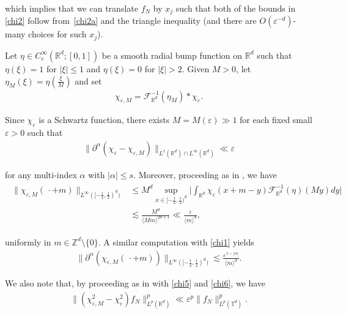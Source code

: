 \documentclass[letterpaper, 11pt,  reqno]{amsart}
\newcommand{\noi}{\noindent}
\newcommand{\Z}{\mathbb{Z}}
\newcommand{\R}{\mathbb{R}}
\newcommand{\T}{\mathbb{T}}
\newcommand{\al}{\alpha}
\newcommand{\eps}{\varepsilon}
\newcommand{\dd}{\partial}
\newcommand{\les}{\lesssim}
\newcommand{\jb}[1]
{\langle #1 \rangle}
\numberwithin{equation}{section}
\numberwithin{theorem}{section}
\begin{document}
\noi
which implies that we can  translate $f_N$ by $x_j$
such that 
both of the bounds in \eqref{chi2} 
follow from~\eqref{chi2a} and the triangle inequality
(and there are $O(\eps^{-d})$-many choices for such $x_j$).










Let $\eta \in C_c^{\infty}(\R^d;[0,1])$ be a smooth radial bump function on $\R^d$ such that 
$\eta(\xi)=1$ for $|\xi|\le 1$
and $\eta(\xi)=0$ for $|\xi|>2$.
 Given $M>0$, let $\eta_M(\xi)=\eta(\frac{\xi}{M})$
 and set 
\begin{align}
\chi_{\eps,M}=\mathcal{F}^{-1}_{\R^d}(\eta_M)*\chi_{\eps}.
\label{chi4}
\end{align}


\noi
Since $\chi_\eps$ is a Schwartz function, 
there exists $M = M(\eps) \gg 1$ for each fixed small $\eps > 0$ such that 
\begin{align}
\| \dd^\al (\chi_{\eps}-\chi_{\eps,M})\|_{L^{1}(\R^d)\cap L^{\infty}(\R^d)}\ll \eps
\label{chi5}
\end{align}


\noi
for any multi-index $\al$
with $|\al|\le s$.
Moreover, proceeding as in \cite[(2.9)]{OST}, we have 
\begin{align}
\begin{split}
\|\chi_{\eps,M}(\,\cdot+m)\|_{L^{\infty}([-\frac 12,\frac 12)^d)}
&\le M^d\sup_{x\in [-\frac 12 ,\frac 12)^d}\bigg |\int_{\R^d}\chi_\eps(x+m-y)\mathcal{F}^{-1}_{\R^d}(\eta)(My)dy\bigg|
\\
& \les \frac{M^d}{\jb{Mm}^{2d+1} }\ll \frac{\eps}{\jb{m}^d}, 
\end{split}
\label{chi6}
\end{align}

\noi
uniformly in $m \in \Z^d\setminus \{0\}$.
A similar computation with \eqref{chi1} yields
\begin{align}
\|\partial^{\alpha}(\chi_{\eps,M}(\,\cdot+m))\|_{L^{\infty}([-\frac12,\frac 12)^d)}
 \les \frac{\eps^{1-|\alpha|}}{\jb{m}^d}.
\label{chi7}
\end{align}


\noi
We also note that, 
by proceeding as in  \cite[(2.10)]{OST} 
with 
\eqref{chi5} and \eqref{chi6}, 
we have 
\begin{align}
\|(\chi^2_{\eps,M} - \chi^2_{\eps})f_N\|^p_{L^{p}(\R^d)}
\ll \eps^p \|f_N\|^p_{L^{p}(\T^d)}.
\label{chi8}
\end{align}
\end{document}
